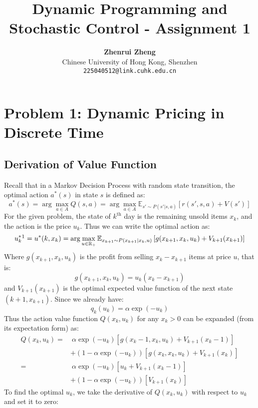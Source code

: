 \documentclass[11pt, a4paper, oneside]{memoir}
\title{\huge\textbf{Dynamic Programming and Stochastic Control - Assignment 1}\vspace{-0.5cm}}
\author{\textbf{Zhenrui Zheng} \vspace{0.5cm} \\ \small Chinese University of Hong Kong, Shenzhen \\ \small\texttt{225040512@link.cuhk.edu.cn}}
\date{}
\begin{document}
\begin{titlingpage}
\maketitle
\renewcommand{\contentsname}{\huge Contents \vspace{-1cm}}
\begin{KeepFromToc} %
\tableofcontents
\end{KeepFromToc}
\end{titlingpage}

\chapter{Problem 1: Dynamic Pricing in Discrete Time}
\section{Derivation of Value Function}
Recall that in a Markov Decision Process with random state transition, the optimal action $a^*(s)$ in state $s$ is defined as:
\[ a^*(s) = \arg \max_{a \in A} Q(s,a) = \arg \max_{a \in A} \mathbb{E}_{s' \sim P(s'|s,a)} \left[ r(s',s,a) + V(s') \right] \]
For the given problem, the state of $k^\text{th}$ day is the remaining unsold items $x_k$,
and the action is the price $u_k$. Thus we can write the optimal action as:
\[ u_k^*\footnotemark = u^*(k, x_k) = \arg \max_{u \in \mathbb{R}_+} \mathbb{E}_{x_{k+1} \sim P(x_{k+1}|x_k,u)} \left[ g(x_{k+1},x_k,u_k) + V_{k+1}(x_{k+1}) \right] \]
Where $g(x_{k+1},x_k,u_k)$ is the profit from selling $x_k-x_{k+1}$ items at price $u$, that is:
\[ g(x_{k+1},x_k,u_k) = u_k(x_k-x_{k+1}) \]
and $V_{k+1} (x_{k+1})$ is the optimal expected value function of the next state $(k+1, x_{k+1})$.
Since we already have:
\[ q_k(u_k) = \alpha \exp (-u_k) \]
Thus the action value function $Q(x_k,u_k)$ for any $x_k > 0$ can be expanded (from its expectation form) as:
\begin{align*}
  Q(x_k,u_k) =& ~\alpha \exp (-u_k) \left[ g(x_k-1,x_k,u_k) + V_{k+1}(x_k-1) \right] \\
  &+ (1-\alpha \exp (-u_k)) \left[ g(x_k,x_k,u_k) + V_{k+1}(x_k) \right] \\
  =& ~\alpha \exp (-u_k) \left[ u_k + V_{k+1}(x_k-1) \right] \\
  &+ (1-\alpha \exp (-u_k)) \left[ V_{k+1}(x_k) \right]
\end{align*}
To find the optimal $u_k$, we take the derivative of $Q(x_k,u_k)$ with respect to $u_k$ and set it to zero:
\end{document}
